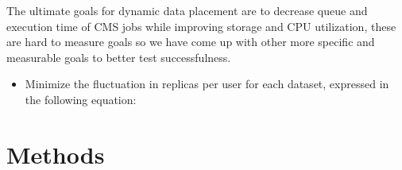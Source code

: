 \documentclass[11pt,a4page]{article}
\begin{document}
The ultimate goals for dynamic data placement are to decrease queue and execution time of CMS jobs while improving storage and CPU utilization, these are hard to measure goals so we have come up with other more specific and measurable goals to better test successfulness.
\begin{itemize}
	\item Minimize the fluctuation in replicas per user for each dataset, expressed in the following equation:
		\begin{displaymath}
		  
		\end{displaymath}
\end{itemize}

\section{Methods}




\end{document}
